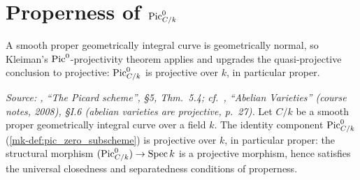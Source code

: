 \section{Properness of \(\operatorname{Pic}^0_{C/k}\)}
\label{mk-sec:pic0_proper}

A smooth proper geometrically integral curve is geometrically normal,
so Kleiman's \(\operatorname{Pic}^0\)-projectivity theorem applies and upgrades the
quasi-projective conclusion to projective: \(\operatorname{Pic}^0_{C/k}\) is
projective over \(k\), in particular proper.

\begin{theorem}
  \label{mk-thm:pic0_proper}

  \textit{Source: \cite{kleiman-picard}, ``The Picard scheme'', \S 5,
  Thm.~5.4; cf.\ \cite{milne-av}, ``Abelian Varieties'' (course notes,
  2008), \S I.6 (abelian varieties are projective, p.~27).}
  Let \(C/k\) be a smooth proper geometrically integral curve over a
  field \(k\). The identity component \(\operatorname{Pic}^0_{C/k}\)
  (\ref{mk-def:pic_zero_subscheme}) is projective over \(k\), in
  particular proper: the structural morphism
  \((\operatorname{Pic}^0_{C/k}) \to \operatorname{Spec} k\) is a projective morphism, hence
  satisfies the universal closedness and separatedness conditions of
  properness.
\end{theorem}
